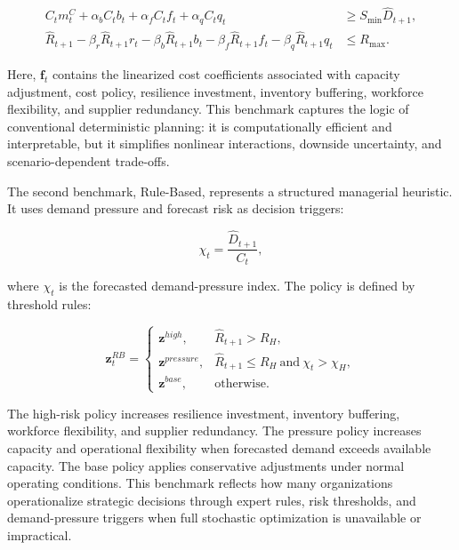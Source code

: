 \documentclass[apajournal,article,submit,pdftex,moreauthors]{Definitions/mdpi}
\begin{document}
\begin{linenomath}
\begin{align}
C_t m^C_t
+ \alpha_b C_t b_t
+ \alpha_f C_t f_t
+ \alpha_q C_t q_t
&\geq
S_{\min}\widehat{D}_{t+1},
\label{eq:lp_service_constraint}\\
\widehat{R}_{t+1}
-\beta_r \widehat{R}_{t+1}r_t
-\beta_b \widehat{R}_{t+1}b_t
-\beta_f \widehat{R}_{t+1}f_t
-\beta_q \widehat{R}_{t+1}q_t
&\leq
R_{\max}.
\label{eq:lp_risk_constraint}
\end{align}
\end{linenomath}
Here, $\mathbf{f}_t$ contains the linearized cost coefficients associated with capacity adjustment, cost policy, resilience investment, inventory buffering, workforce flexibility, and supplier redundancy. This benchmark captures the logic of conventional deterministic planning: it is computationally efficient and interpretable, but it simplifies nonlinear interactions, downside uncertainty, and scenario-dependent trade-offs.

The second benchmark, Rule-Based, represents a structured managerial heuristic. It uses demand pressure and forecast risk as decision triggers:

\begin{linenomath}
\begin{equation}
\chi_t
=
\frac{\widehat{D}_{t+1}}{C_t},
\label{eq:rule_pressure}
\end{equation}
\end{linenomath}
where $\chi_t$ is the forecasted demand-pressure index. The policy is defined by threshold rules:

\begin{linenomath}
\begin{equation}
\mathbf{z}_t^{RB}
=
\begin{cases}
\mathbf{z}^{high}, & \widehat{R}_{t+1}>R_H,\\
\mathbf{z}^{pressure}, & \widehat{R}_{t+1}\leq R_H \ \text{and}\ \chi_t>\chi_H,\\
\mathbf{z}^{base}, & \text{otherwise}.
\end{cases}
\label{eq:rule_based_policy}
\end{equation}
\end{linenomath}
The high-risk policy increases resilience investment, inventory buffering, workforce flexibility, and supplier redundancy. The pressure policy increases capacity and operational flexibility when forecasted demand exceeds available capacity. The base policy applies conservative adjustments under normal operating conditions. This benchmark reflects how many organizations operationalize strategic decisions through expert rules, risk thresholds, and demand-pressure triggers when full stochastic optimization is unavailable or impractical.
\end{document}
